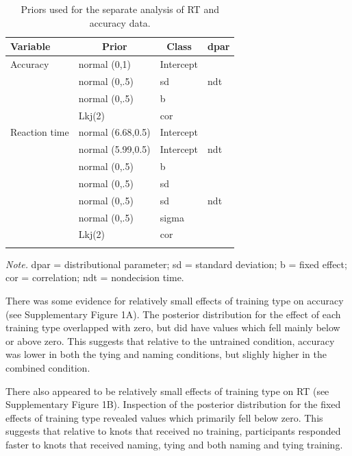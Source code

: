 \documentclass[
  man,floatsintext]{apa6}
\begin{document}
\begin{table}[tbp]

\begin{center}
\begin{threeparttable}

\caption{\label{tab:prior-table}Priors used for the separate analysis of RT and accuracy data.}

\begin{tabular}{llll}
\toprule
Variable & \multicolumn{1}{c}{Prior} & \multicolumn{1}{c}{Class} & \multicolumn{1}{c}{dpar}\\
\midrule
Accuracy & normal (0,1) & Intercept & \\
 & normal (0,.5) & sd & ndt\\
 & normal (0,.5) & b & \\
 & Lkj(2) & cor & \\
Reaction time & normal (6.68,0.5) & Intercept & \\
 & normal (5.99,0.5) & Intercept & ndt\\
 & normal (0,.5) & b & \\
 & normal (0,.5) & sd & \\
 & normal (0,.5) & sd & ndt\\
 & normal (0,.5) & sigma & \\
 & Lkj(2) & cor & \\
\bottomrule
\addlinespace
\end{tabular}

\begin{tablenotes}[para]
\normalsize{\textit{Note.} dpar = distributional parameter; sd = standard deviation; b = fixed effect; cor = correlation; ndt = nondecision time.}
\end{tablenotes}

\end{threeparttable}
\end{center}

\end{table}

\newpage

There was some evidence for relatively small effects of training type on accuracy (see Supplementary Figure 1A). The posterior distribution for the effect of each training type overlapped with zero, but did have values which fell mainly below or above zero. This suggests that relative to the untrained condition, accuracy was lower in both the tying and naming conditions, but slighly higher in the combined condition.

There also appeared to be relatively small effects of training type on RT (see Supplementary Figure 1B). Inspection of the posterior distribution for the fixed effects of training type revealed values which primarily fell below zero. This suggests that relative to knots that received no training, participants responded faster to knots that received naming, tying and both naming and tying training.
\end{document}
